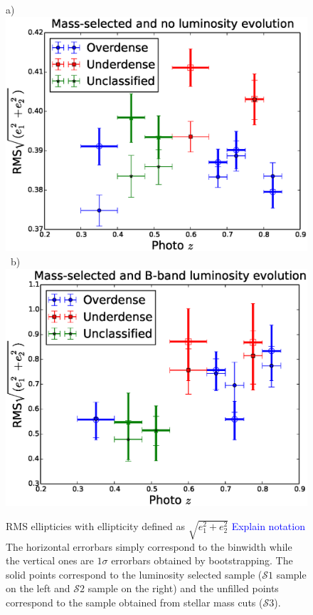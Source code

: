 \documentclass[twocolumn,useAMS,usenatbib]{mn2e}
\newcommand{\arun}[1]{{\textcolor{blue}{#1}}}
\newcommand{\s}{\ensuremath{\mathcal{S}}}
\begin{document}
\begin{figure}
 a) \includegraphics[width=1.0\columnwidth]{rms_ellip_momentbased_noevolution.eps} \
 b) \includegraphics[width=1.0\columnwidth]{rms_ellip_momentbased_Bbandevolution_masscut.eps} \\
 \caption{RMS ellipticies with ellipticity defined as $\sqrt{e_1^2+e_2^2}$ \arun{Explain notation} \\ The horizontal errorbars simply correspond to the binwidth while the vertical ones
          are $1\sigma$ errorbars obtained by bootstrapping. The solid points correspond to the luminosity selected sample (\s$1$ sample on the left and \s$2$ sample on the right) and the unfilled
          points correspond to the sample obtained from stellar mass cuts (\s$3$). }
 \label{fig:rms_ellip_momentbased}         
\end{figure}
\end{document}
